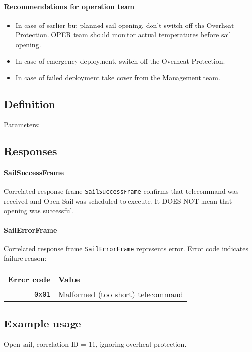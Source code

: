 \paragraph{Recommendations for operation team}
\begin{itemize}
    \item In case of earlier but planned sail opening, don't switch off the Overheat Protection. OPER team should monitor actual temperatures before sail opening.
	\item In case of emergency deployment, switch off the Overheat Protection.
	\item In case of failed deployment take cover from the Management team.
\end{itemize}


\subsection{Definition}

Parameters: 

\begin{tcarglist}
\end{tcarglist}


\subsection{Responses}

\paragraph{SailSuccessFrame}
Correlated response frame \texttt{SailSuccessFrame} confirms that telecommand was received and Open Sail was scheduled to execute. It DOES NOT mean that opening was successful. 

\paragraph{SailErrorFrame}
Correlated response frame \texttt{SailErrorFrame} represents error. Error code indicates failure reason:

\begin{tabular}{r | l}
	Error code & Value \\
	\hline
	\texttt{0x01} & Malformed (too short) telecommand \\
\end{tabular}

\subsection{Example usage}
Open sail, correlation ID = 11, ignoring overheat protection.

